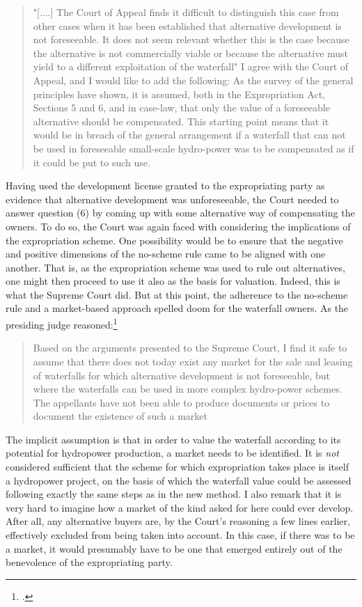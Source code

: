 \begin{quote}
"[....] The Court of Appeal finds it difficult to distinguish this case from other cases when it has been established that alternative development is not foreseeable. It does not seem relevant whether this is the case because the alternative is not commercially viable or because the alternative must yield to a different exploitation of the waterfall" 
I agree with the Court of Appeal, and I would like to add the following: As the survey of the general principles have shown, it is assumed, both in the Expropriation Act, Sections 5 and 6, and in case-law, that only the value of a foreseeable alternative should be compensated. This starting point means that it would be in breach of the general arrangement if a waterfall that can not be used in foreseeable small-scale hydro-power was to be compensated as if it could be put to such use.
\end{quote}

Having used the development license granted to the expropriating party as evidence that alternative development was unforeseeable, the Court needed to answer question (6) by coming up with some alternative way of compensating the owners.  To do so, the Court was again faced with considering the implications of the expropriation scheme. One possibility would be to ensure that the negative and positive dimensions of the no-scheme rule came to be aligned with one another. That is, as the expropriation scheme was used to rule out alternatives, one might then proceed to use it also as the basis for valuation. Indeed, this is what the Supreme Court did. But at this point, the adherence to the no-scheme rule and a market-based approach spelled doom for the waterfall owners. As the presiding judge reasoned:\footcite[]{otra13}

\begin{quote}
Based on the arguments presented to the Supreme Court, I find it safe to assume that there does not today exist any market for the sale and leasing of waterfalls for which alternative development is not foreseeable, but where the waterfalls can be used in more complex hydro-power schemes. The appellants have not been able to produce documents or prices to document the existence of such a market
\end{quote}

The implicit assumption is that in order to value the waterfall according to its potential for hydropower production, a market needs to be identified. It is \emph{not} considered sufficient that the scheme for which expropriation takes place is itself a hydropower project, on the basis of which the  waterfall value could be assessed following exactly the same steps as in the new method. I also remark that it is very hard to imagine how a market of the kind asked for here could ever develop. After all, any alternative buyers are, by the Court's reasoning a few lines earlier, effectively excluded from being taken into account. In this case, if there was to be a market, it would presumably have to be one that emerged entirely out of the benevolence of the expropriating party.

